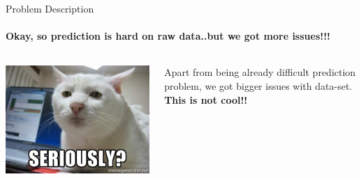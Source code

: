 \documentclass{beamer}
\begin{document}
\begin{frame}{Problem Description}
  \framesubtitle{Okay, so prediction is hard on raw data..but we got more issues!!!}

  \begin{columns}
    \includegraphics[scale=0.38]{img/serious.jpg}
    \begin{block}{}
      Apart from being already difficult prediction problem, we got bigger
      issues with data-set. \textbf{This is not cool!!}
    \end{block}
  \end{columns}
\end{frame}
\end{document}
